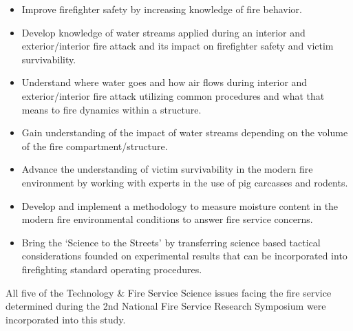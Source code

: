\documentclass[12pt,oneside]{book}
\begin{document}
\begin{itemize}
	\item Improve firefighter safety by increasing knowledge of fire behavior.
	\item Develop knowledge of water streams applied during an interior and exterior/interior fire attack and its impact on firefighter safety and victim survivability.
	\item Understand where water goes and how air flows during interior and exterior/interior fire attack utilizing common procedures and what that means to fire dynamics within a structure.
	\item Gain understanding of the impact of water streams depending on the volume of the fire compartment/structure.
	\item Advance the understanding of victim survivability in the modern fire environment by working with experts in the use of pig carcasses and rodents.
	\item Develop and implement a methodology to measure moisture content in the modern fire environmental conditions to answer fire service concerns.
	\item Bring the `Science to the Streets' by transferring science based tactical considerations founded on experimental results that can be incorporated into firefighting standard operating procedures.
	\end{itemize}

All five of the Technology \& Fire Service Science issues facing the fire service determined during the 2nd National Fire Service Research Symposium \cite{NFFF} were incorporated into this study.

\clearpage




\end{document}
